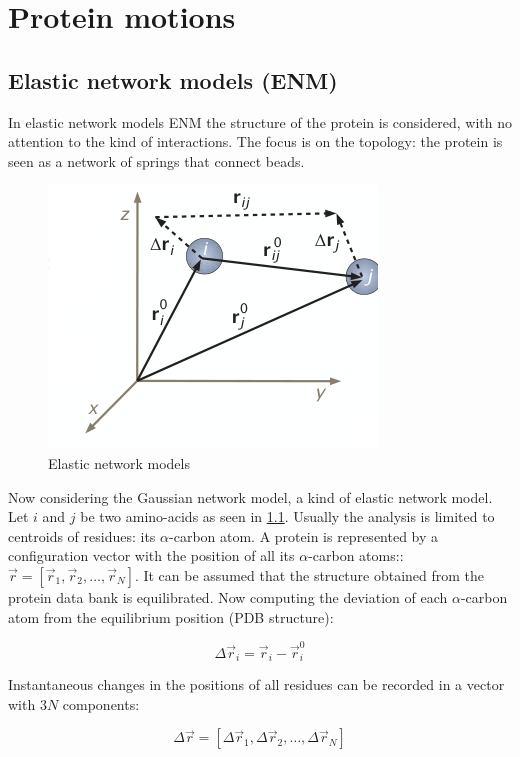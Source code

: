 \graphicspath{{chapters/15/images/}}
\chapter{Protein motions}

\section{Elastic network models (ENM)}
In elastic network models ENM the structure of the protein is considered, with no attention to the kind of interactions.
The focus is on the topology: the protein is seen as a network of springs that connect beads.

\begin{figure}[H]
	\centering
	\includegraphics[scale = 0.5]{enm-theory}
	\caption{Elastic network models}
	\label{fig:enm-theory}
\end{figure}

Now considering the Gaussian network model, a kind of elastic network model.
Let $i$ and $j$ be two amino-acids as seen in \ref{fig:enm-theory}.
Usually the analysis is limited to centroids of residues: its $\alpha$-carbon atom.
A protein is represented by a configuration vector with the position of all its $\alpha$-carbon atoms:: $\vec{r} = [\vec{r}_1, \vec{r}_2, \dots, \vec{r}_N]$.
It can be assumed that the structure obtained from the protein data bank is equilibrated.
Now computing the deviation of each $\alpha$-carbon atom from the equilibrium position (PDB structure):

$$\Delta\vec{r}_i = \vec{r}_i-\vec{r}_i^0$$

Instantaneous changes in the positions of all residues can be recorded in a vector with $3N$ components:

$$\Delta\vec{r} = [\Delta\vec{r}_1, \Delta\vec{r}_2, \dots, \Delta\vec{r}_N]$$


